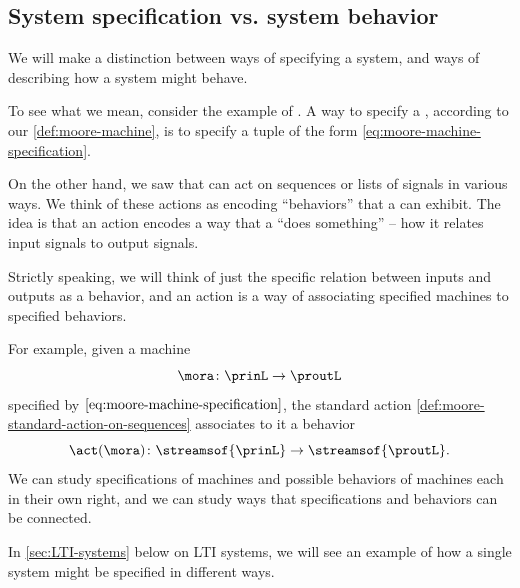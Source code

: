 
\subsection{System specification vs. system behavior}

We will make a distinction between ways of specifying a system, and ways of describing how a system might behave.

To see what we mean, consider the example of .
A way to specify a , according to our \cref{def:moore-machine}, is to specify a tuple of the form \cref{eq:moore-machine-specification}.

On the other hand, we saw that  can act on sequences or lists of signals in various ways.
We think of these actions as encoding ``behaviors'' that a  can exhibit.
The idea is that an action encodes a way that a  ``does something'' -- how it relates input signals to output signals.

Strictly speaking, we will think of just the specific relation between inputs and outputs as a behavior, and an action is a way of associating specified machines to specified behaviors.


For example, given a machine
\begin{equation}
    \mora \colon \prinL \to \proutL
\end{equation}
specified by $\cref{eq:moore-machine-specification}$, the standard action \cref{def:moore-standard-action-on-sequences} associates to it a behavior
\begin{equation}
    \act(\mora) \colon \streamsof{\prinL} \to \streamsof{\proutL}.
\end{equation}
We can study specifications of machines and possible behaviors of machines each in their own right, and we can study ways that specifications and behaviors can be connected.


In \cref{sec:LTI-systems} below on LTI systems, we will see an example of how a single system might be specified in different ways.

